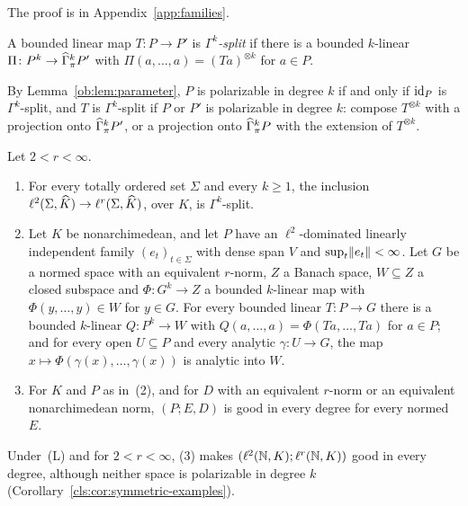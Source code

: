 The proof is in Appendix~\ref{app:families}.

\begin{definition}\label{fam2:def:gamma-split}
A bounded linear map $T\colon P\to P'$ is \emph{$\Gamma^k$-split} if there is a bounded $k$-linear
$\Pi\colon P^k\to\widehat\Gamma^k_\pi P'$ with $\Pi(a,\dots,a)=(Ta)^{\otimes k}$ for $a\in P$.
\end{definition}

By Lemma~\ref{ob:lem:parameter}, $P$ is polarizable in degree $k$ if and only if $\mathrm{id}_P$ is $\Gamma^k$-split, and $T$ is
$\Gamma^k$-split if $P$ or $P'$ is polarizable in degree $k$: compose $T^{\otimes k}$ with a projection onto
$\widehat\Gamma^k_\pi P'$, or a projection onto $\widehat\Gamma^k_\pi P$ with the extension of $T^{\otimes k}$.

\begin{theorem}\label{fam2:thm:gamma-split}
Let $2<r<\infty$.
\begin{enumerate}
\item For every totally ordered set $\Sigma$ and every $k\ge1$, the inclusion $\ell^2(\Sigma,\widehat K)\to\ell^r(\Sigma,\widehat K)$,
over $K$, is $\Gamma^k$-split.
\item Let $K$ be nonarchimedean, and let $P$ have an $\ell^2$-dominated linearly independent family $(e_t)_{t\in\Sigma}$ with dense span $V$ and
$\sup_t\lVert e_t\rVert<\infty$. Let $G$ be a normed space with an equivalent $r$-norm, $Z$ a Banach space, $W\subseteq Z$ a
closed subspace and $\Phi\colon G^k\to Z$ a bounded $k$-linear map with $\Phi(y,\dots,y)\in W$ for $y\in G$. For every
bounded linear $T\colon P\to G$ there is a bounded $k$-linear $Q\colon P^k\to W$ with $Q(a,\dots,a)=\Phi(Ta,\dots,Ta)$ for
$a\in P$; and for every open $U\subseteq P$ and every analytic $\gamma\colon U\to G$, the map
$x\mapsto\Phi(\gamma(x),\dots,\gamma(x))$ is analytic into $W$.
\item For $K$ and $P$ as in~(2), and for $D$ with an equivalent $r$-norm or an equivalent nonarchimedean norm, $(P;E,D)$ is good in every degree for every normed $E$.
\end{enumerate}
\end{theorem}

Under~\textup{(L)} and for $2<r<\infty$, (3) makes $(\ell^2(\mathbb N,K);\ell^r(\mathbb N,K))$ good in every degree, although neither
space is polarizable in degree $k$ (Corollary~\ref{cls:cor:symmetric-examples}).

